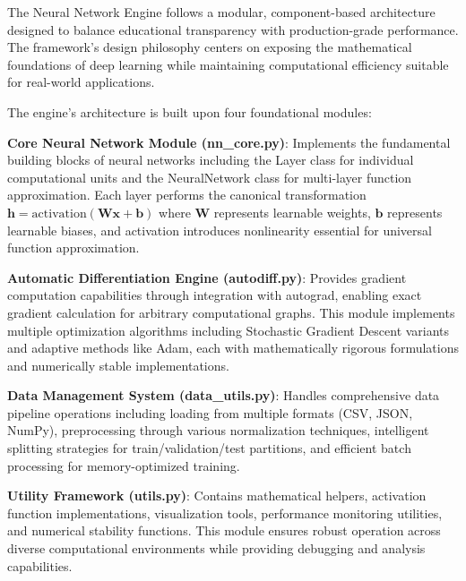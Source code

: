 \documentclass[11pt,a4paper]{report}
\begin{document}
The Neural Network Engine follows a modular, component-based architecture designed to balance educational transparency with production-grade performance. The framework's design philosophy centers on exposing the mathematical foundations of deep learning while maintaining computational efficiency suitable for real-world applications.

The engine's architecture is built upon four foundational modules:

\textbf{Core Neural Network Module (nn\_core.py)}: Implements the fundamental building blocks of neural networks including the Layer class for individual computational units and the NeuralNetwork class for multi-layer function approximation. Each layer performs the canonical transformation $\mathbf{h} = \text{activation}(\mathbf{W}\mathbf{x} + \mathbf{b})$ where $\mathbf{W}$ represents learnable weights, $\mathbf{b}$ represents learnable biases, and activation introduces nonlinearity essential for universal function approximation.

\textbf{Automatic Differentiation Engine (autodiff.py)}: Provides gradient computation capabilities through integration with autograd, enabling exact gradient calculation for arbitrary computational graphs. This module implements multiple optimization algorithms including Stochastic Gradient Descent variants and adaptive methods like Adam, each with mathematically rigorous formulations and numerically stable implementations.

\textbf{Data Management System (data\_utils.py)}: Handles comprehensive data pipeline operations including loading from multiple formats (CSV, JSON, NumPy), preprocessing through various normalization techniques, intelligent splitting strategies for train/validation/test partitions, and efficient batch processing for memory-optimized training.

\textbf{Utility Framework (utils.py)}: Contains mathematical helpers, activation function implementations, visualization tools, performance monitoring utilities, and numerical stability functions. This module ensures robust operation across diverse computational environments while providing debugging and analysis capabilities.
\end{document}

